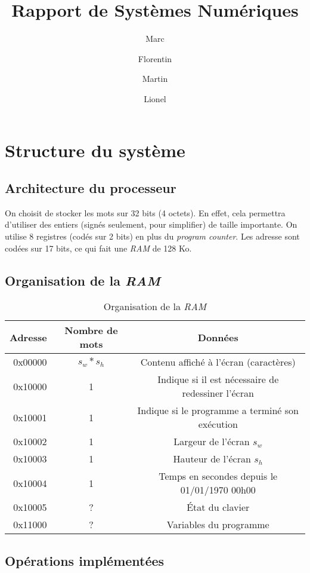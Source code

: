\documentclass[a4paper, 10pt, french]{article}
\title{Rapport de Systèmes Numériques}
\author{Marc \bsc{Ducret} \and Florentin \bsc{Guth} \and Martin \bsc{Ruffel} \and Lionel \bsc{Zoubritzky}}
\newcommand{\foreign}[1]{\emph{#1}}
\begin{document}
\maketitle


\section{Structure du système}

\subsection{Architecture du processeur}

On choisit de stocker les mots sur 32 bits (4 octets). En effet, cela permettra d'utiliser des entiers (signés seulement, pour simplifier) de taille importante. On utilise 8 registres (codés sur 2 bits) en plus du \foreign{program counter}. Les adresse sont codées sur 17 bits, ce qui fait une \foreign{RAM} de 128 Ko.

\subsection{Organisation de la \foreign{RAM}}

\begin{table}[h]
 \centering
 \begin{tabular}{|R|c|c|}
  \hline
  Adresse & Nombre de mots & Données \\
  \hline
  0x00000 & $s_w * s_h$ & Contenu affiché à l'écran (caractères) \\
  \hline
  0x10000 & 1 & Indique si il est nécessaire de redessiner l'écran \\
  0x10001 & 1 & Indique si le programme a terminé son exécution \\
  0x10002 & 1 & Largeur de l'écran $s_w$ \\
  0x10003 & 1 & Hauteur de l'écran $s_h$ \\
  0x10004 & 1 & Temps en secondes depuis le 01/01/1970 00h00 \\
  \hline
  0x10005 & ? & \'Etat du clavier \\
  \hline
  0x11000 & ? & Variables du programme \\
  \hline
 \end{tabular}
 \caption{Organisation de la \foreign{RAM}}
\end{table}


\subsection{Opérations implémentées}
\end{document}
